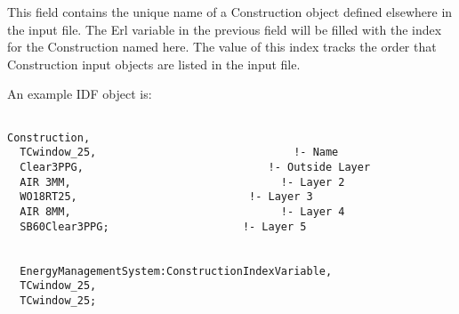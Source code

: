 This field contains the unique name of a Construction object defined elsewhere in the input file. The Erl variable in the previous field will be filled with the index for the Construction named here. The value of this index tracks the order that Construction input objects are listed in the input file.

An example IDF object is:

\begin{lstlisting}

Construction,
  TCwindow_25,                               !- Name
  Clear3PPG,                             !- Outside Layer
  AIR 3MM,                                 !- Layer 2
  WO18RT25,                           !- Layer 3
  AIR 8MM,                                 !- Layer 4
  SB60Clear3PPG;                     !- Layer 5


  EnergyManagementSystem:ConstructionIndexVariable,
  TCwindow_25,
  TCwindow_25;
\end{lstlisting}
